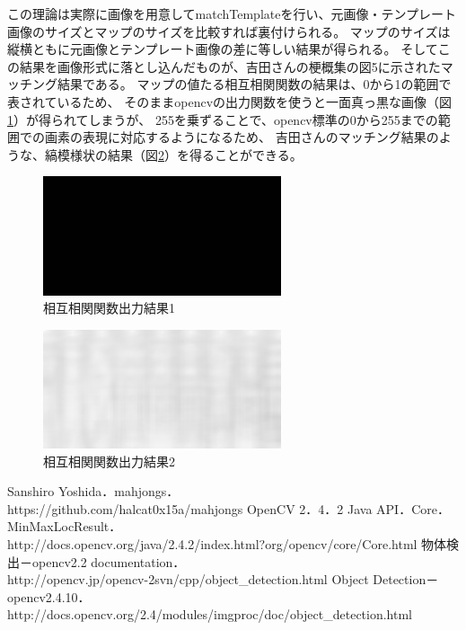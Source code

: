 \documentclass{jsarticle}
\begin{document}
\begin{multicols}{2}
この理論は実際に画像を用意してmatchTemplateを行い、元画像・テンプレート画像のサイズとマップのサイズを比較すれば裏付けられる。
マップのサイズは縦横ともに元画像とテンプレート画像の差に等しい結果が得られる。
そしてこの結果を画像形式に落とし込んだものが、吉田さんの梗概集の図5に示されたマッチング結果である。
マップの値たる相互相関関数の結果は、0から1の範囲で表されているため、
そのままopencvの出力関数を使うと一面真っ黒な画像（図\ref{fig:res}）が得られてしまうが、
255を乗ずることで、opencv標準の0から255までの範囲での画素の表現に対応するようになるため、
吉田さんのマッチング結果のような、縞模様状の結果（図\ref{fig:res2}）を得ることができる。

\begin{figure}[H]
  \begin{center}
    \includegraphics[clip,width=7.0cm]{./img/res.png}
    \caption{相互相関関数出力結果1}
    \label{fig:res}
  \end{center}
\end{figure}

\begin{figure}[H]
  \begin{center}
    \includegraphics[clip,width=7.0cm]{./img/res2.png}
    \caption{相互相関関数出力結果2}
    \label{fig:res2}
  \end{center}
\end{figure}

%

\end{multicols}

\newpage

\begin{thebibliography}{9}
	Sanshiro Yoshida．mahjongs．\\
	https://github.com/halcat0x15a/mahjongs
	OpenCV 2．4．2 Java API．Core．MinMaxLocResult．\\
	http://docs.opencv.org/java/2.4.2/index.html?org/opencv/core/Core.html
	物体検出－opencv2.2 documentation． \\
	http://opencv.jp/opencv-2svn/cpp/object\_detection.html
	Object Detection－opencv2.4.10．\\
	http://docs.opencv.org/2.4/modules/imgproc/doc/object\_detection.html
\end{thebibliography}
\end{document}
